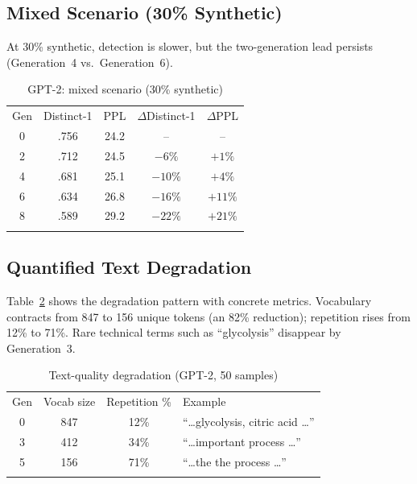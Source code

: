 \documentclass{svproc}
\newcommand{\dist}[1]{Distinct-#1}
\begin{document}
\subsection{Mixed Scenario (30\% Synthetic)}
At 30\% synthetic, detection is slower, but the two-generation lead persists
(Generation~4 vs.\ Generation~6).

\begin{table}[t]
\centering
\caption{GPT-2: mixed scenario (30\% synthetic)}
\label{tab:mixed}
\begin{tabular}{ccccc}
\hline\noalign{\smallskip}
Gen & \dist{1} & PPL & $\Delta$\dist{1} & $\Delta$PPL \\
\noalign{\smallskip}\hline\noalign{\smallskip}
0 & .756 & 24.2 & --      & --      \\
2 & .712 & 24.5 & $-6\%$  & $+1\%$  \\
4 & .681 & 25.1 & $-10\%$ & $+4\%$  \\
6 & .634 & 26.8 & $-16\%$ & $+11\%$ \\
8 & .589 & 29.2 & $-22\%$ & $+21\%$ \\
\noalign{\smallskip}\hline
\end{tabular}
\end{table}

\subsection{Quantified Text Degradation}
Table~\ref{tab:degradation} shows the degradation pattern with concrete metrics.
Vocabulary contracts from 847 to 156 unique tokens (an 82\% reduction); repetition
rises from 12\% to 71\%. Rare technical terms such as ``glycolysis'' disappear by
Generation~3.

\begin{table}[t]
\centering
\caption{Text-quality degradation (GPT-2, 50 samples)}
\label{tab:degradation}
\begin{tabular}{cccl}
\hline\noalign{\smallskip}
Gen & Vocab size & Repetition \% & Example \\
\noalign{\smallskip}\hline\noalign{\smallskip}
0 & 847 & 12\% & ``\dots glycolysis, citric acid \dots'' \\
3 & 412 & 34\% & ``\dots important process \dots'' \\
5 & 156 & 71\% & ``\dots the the process \dots'' \\
\noalign{\smallskip}\hline
\end{tabular}
\end{table}
\end{document}
